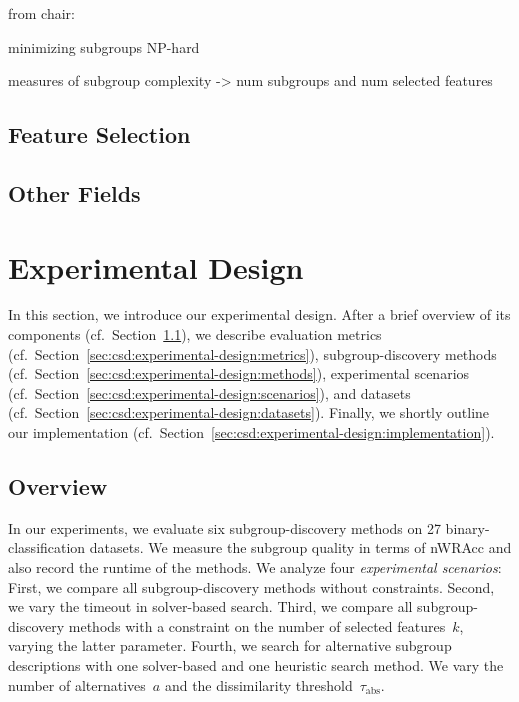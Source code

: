 \documentclass{article}
\theoremstyle{definition}
\begin{document}
from chair: \cite{arzamasov2021reds} \cite{arzamasov2022pedagogical} \cite{vollmer2019informative}

minimizing subgroups NP-hard~\cite{boley2009non}

measures of subgroup complexity \cite{helal2016subgroup, herrera2011overview, ventura2018subgroup} -> num subgroups and num selected features

\subsection{Feature Selection}
\label{sec:csd:related-work:feature-selection}

\cite{bach2022empirical} \cite{bach2023finding}

\subsection{Other Fields}
\label{sec:csd:related-work:other}

\cite{bailey2014alternative} \cite{grossi2017survey}
\cite{guidotti2022counterfactual}
\cite{narodytska2018learning} \cite{schidler2021sat} \cite{yu2021learning}

\section{Experimental Design}
\label{sec:csd:experimental-design}

In this section, we introduce our experimental design.
After a brief overview of its components (cf.~Section~\ref{sec:csd:experimental-design:overview}), we describe evaluation metrics (cf.~Section~\ref{sec:csd:experimental-design:metrics}), subgroup-discovery methods (cf.~Section~\ref{sec:csd:experimental-design:methods}), experimental scenarios (cf.~Section~\ref{sec:csd:experimental-design:scenarios}), and datasets (cf.~Section~\ref{sec:csd:experimental-design:datasets}).
Finally, we shortly outline our implementation (cf.~Section~\ref{sec:csd:experimental-design:implementation}).

\subsection{Overview}
\label{sec:csd:experimental-design:overview}

In our experiments, we evaluate six subgroup-discovery methods on 27 binary-classification datasets.
We measure the subgroup quality in terms of nWRAcc and also record the runtime of the methods.
We analyze four \emph{experimental scenarios}:
First, we compare all subgroup-discovery methods without constraints.
Second, we vary the timeout in solver-based search.
Third, we compare all subgroup-discovery methods with a constraint on the number of selected features~$k$, varying the latter parameter.
Fourth, we search for alternative subgroup descriptions with one solver-based and one heuristic search method.
We vary the number of alternatives~$a$ and the dissimilarity threshold~$\tau_{\text{abs}}$.
\end{document}
